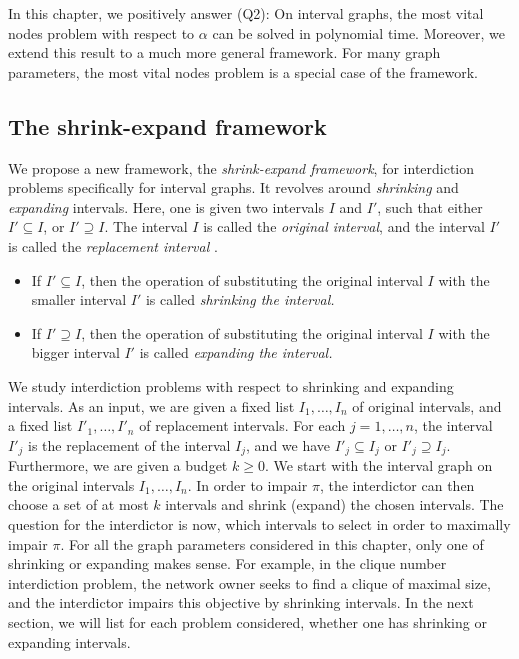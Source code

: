 In this chapter, we positively answer (Q2): On interval graphs, the most vital nodes problem with respect to $\alpha$ can be solved in polynomial time.  Moreover, we extend this result to a much more general framework. For many graph parameters, the most vital nodes problem is a special case of the framework.

\subsection{The shrink-expand framework} 
We propose a new framework, the \emph{shrink-expand framework}, for interdiction problems specifically 
for interval graphs. It revolves around \emph{shrinking} and \emph{expanding} intervals. Here, one is given two intervals $I$ and $I'$, such that either $I' \subseteq I$, or $I' \supseteq I$. The interval $I$ is called the \emph{original interval}, and the interval $I'$ is called the \emph{replacement interval} .
\begin{itemize}
\item If $I' \subseteq I$, then the operation of substituting the original interval $I$ with the smaller interval $I'$ is called \emph{shrinking the interval.}
\item  If $I' \supseteq I$, then the operation of substituting the original interval $I$ with the bigger interval $I'$ is called \emph{expanding the interval.}
\end{itemize}
 
We study interdiction problems with respect to shrinking and expanding intervals. As an input, we are given a fixed list $I_1,\dots,I_n$ of original intervals, and a fixed list $I'_1,\dots,I'_n$ of replacement intervals. For each $j=1,\dots,n$, the interval $I'_j$ is the replacement of the interval $I_j$, and we have $I'_j \subseteq I_j$ or $I'_j \supseteq I_j$.
Furthermore, we are given a budget $k \geq 0$. We start with the interval graph on the original intervals $I_1,\dots,I_n$.
In order to impair $\pi$, the interdictor can then choose a set of at most $k$ intervals and shrink (expand) the chosen intervals.
The question for the interdictor is now, which intervals to select in order to maximally impair $\pi$. For all the graph parameters considered in this chapter, only one of shrinking or expanding makes sense. For example, in the clique number interdiction problem, the network owner seeks to find a clique of maximal size, and the interdictor impairs this objective by shrinking intervals. In the next section, we will list for each problem considered, whether one has shrinking or expanding intervals.

